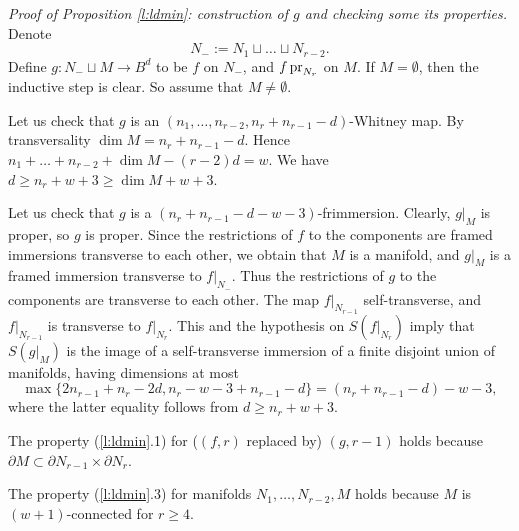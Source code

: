\documentclass[12pt]{article}
\def\pr{\mathop{\fam0 pr}}
\theoremstyle{plain}
\theoremstyle{definition}
\begin{document}
\smallskip
{\it Proof of Proposition \ref{l:ldmin}: construction of $g$ and checking some its properties.}
Denote
$$N_-:=N_1\sqcup\ldots\sqcup N_{r-2}.$$
Define $g:N_-\sqcup M\to B^d$ to be $f$ on $N_-$, and $f\pr_{N_r}$ on $M$.
If $M=\emptyset$, then the inductive step is clear.
So assume that $M\ne\emptyset$.

Let us check that $g$ is an $(n_1,\ldots,n_{r-2},n_r+n_{r-1}-d)$-Whitney map.
By transversality $\dim M=n_r+n_{r-1}-d$.
Hence $n_1+\ldots +n_{r-2}+\dim M-(r-2)d=w$.
We have $d\ge n_r+w+3\ge\dim M+w+3$.

Let us check that $g$ is a $(n_r+n_{r-1}-d-w-3)$-frimmersion.
Clearly, $g|_M$ is proper, so $g$ is proper.
Since the restrictions of $f$ to the components are framed immersions transverse to each other, we obtain that $M$ is a manifold,
and $g|_M$ is a framed immersion transverse to $f|_{N_-}$.
Thus the restrictions of $g$ to the components are transverse to each other.
The map $f|_{N_{r-1}}$ self-transverse, and $f|_{N_{r-1}}$ is transverse to $f|_{N_r}$.
This and the hypothesis on $S(f|_{N_r})$ imply that $S(g|_M)$ is the image of a self-transverse immersion of a finite disjoint union of manifolds, having dimensions at most
$$\max\{2n_{r-1}+n_r-2d,n_r-w-3+n_{r-1}-d\}=(n_r+n_{r-1}-d)-w-3,$$
where the latter equality follows from $d\ge n_r+w+3$.

The property (\ref{l:ldmin}.1) for ($(f,r)$ replaced by) $(g,r-1)$ holds because
$\partial M\subset\partial N_{r-1}\times \partial N_r$.

The property (\ref{l:ldmin}.3) for manifolds $N_1,\ldots,N_{r-2},M$ holds because $M$ is $(w+1)$-connected for $r\ge4$.

\end{document}
